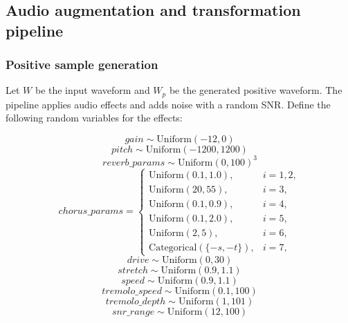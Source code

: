 \subsection{Audio augmentation and transformation pipeline}
\subsubsection{Positive sample generation}
Let $W$ be the input waveform and $W_p$ be the generated positive waveform. The pipeline applies audio effects and adds noise with a random SNR. Define the following random variables for the effects:

\begin{equation}
gain \sim \text{Uniform}(-12, 0)
\end{equation}
\begin{equation}
pitch \sim \text{Uniform}(-1200, 1200)
\end{equation}
\begin{equation}
reverb\_params \sim \text{Uniform}(0, 100)^3
\end{equation}
\begin{equation}
chorus\_params = \begin{cases}
\text{Uniform}(0.1, 1.0), & i=1,2, \\
\text{Uniform}(20, 55), & i=3, \\
\text{Uniform}(0.1, 0.9), & i=4, \\
\text{Uniform}(0.1, 2.0), & i=5, \\
\text{Uniform}(2, 5), & i=6, \\
\text{Categorical}(\{-s, -t\}), & i=7,
\end{cases}
\end{equation}
\begin{equation}
drive \sim \text{Uniform}(0, 30)
\end{equation}
\begin{equation}
stretch \sim \text{Uniform}(0.9, 1.1)
\end{equation}
\begin{equation}
speed \sim \text{Uniform}(0.9, 1.1)
\end{equation}
\begin{equation}
tremolo\_speed \sim \text{Uniform}(0.1, 100)
\end{equation}
\begin{equation}
tremolo\_depth \sim \text{Uniform}(1, 101)
\end{equation}
\begin{equation}
snr\_range \sim \text{Uniform}(12, 100)
\end{equation}


